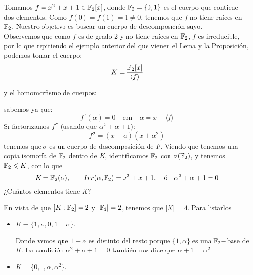 \begin{ejemplo}
    Tomamos $f = x^2+x+1\in \mathbb{F}_2[x]$, donde $\mathbb{F}_2 = \{0,1\}$ es el cuerpo que contiene dos elementos. Como $f(0) = f(1) = 1 \neq 0$, tenemos que $f$ no tiene raíces en $\mathbb{F}_2$. Nuestro objetivo es buscar un cuerpo de descomposición suyo.\\

    \noindent
    Observemos que como $f$ es de grado 2 y no tiene raíces en $\mathbb{F}_2$, $f$ es irreducible, por lo que repitiendo el ejemplo anterior del que vienen el Lema y la Proposición, podemos tomar el cuerpo:
    \begin{equation*}
        K = \dfrac{\mathbb{F}_2[x]}{\langle f \rangle }
    \end{equation*}

    y el homomorfismo de cuerpos:

    sabemos ya que:
    \begin{equation*}
        f^\sigma(\alpha) = 0 \quad \text{con}\quad  \alpha = x+\langle f \rangle 
    \end{equation*}
    Si factorizamos $f^\sigma$ (usando que $\alpha^2 + \alpha+1$):
    \begin{equation*}
        f^\sigma = (x+\alpha)(x+\alpha^2)
    \end{equation*}
    tenemos que $\sigma$ es un cuerpo de descomposición de $F$. Viendo que tenemos una copia isomorfa de $\mathbb{F}_2$ dentro de $K$, identificamos $\mathbb{F}_2$ con $\sigma(\mathbb{F}_2)$, y tenemos $\mathbb{F}_2\leqslant K$, con lo que:
    \begin{equation*}
        K = \mathbb{F}_2(\alpha), \qquad Irr(\alpha,\mathbb{F}_2) = x^2+x+1, \quad \text{ó}\quad \alpha^2 + \alpha+1=0
    \end{equation*}
    ¿Cuántos elementos tiene $K$?

    \noindent
    En vista de que $[K:\mathbb{F}_2] = 2$ y $|\mathbb{F}_2| = 2$, tenemos que $|K| = 4$. Para listarlos:
    \begin{itemize}
        \item $K = \{1,\alpha,0,1+\alpha\}$. 

            Donde vemos que $1+\alpha$ es distinto del resto porque $\{1,\alpha\}$ es una $\mathbb{F}_2-$base de $K$. La condición $\alpha^2 + \alpha + 1 = 0$ también nos dice que $\alpha+1= \alpha^2$:
        \item $K = \{0,1,\alpha,\alpha^2\}$.
    \end{itemize}
\end{ejemplo}

